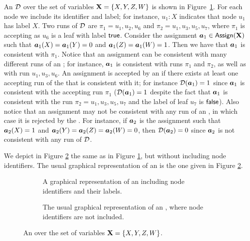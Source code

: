 \begin{example}
  An \nbdd $\mathcal{D}$ over the set of variables $\mathbf{X} = \{X,Y,Z,W\}$ is shown in Figure~\ref{fig-nbdd-with-id}. For each node we include its identifier and label; for instance, $u_1 : X$ indicates that node $u_1$ has label $X$. Two runs of $\mathcal{D}$ are $\pi_1 = u_1,u_2,u_6$ and $\pi_2 = u_1, u_3, u_5, u_7$, where $\pi_1$ is accepting as $u_6$ is a leaf with label $\mathsf{true}$. Consider the assignment $\boldsymbol{a}_1 \in \mathsf{Assign}(\mathbf{X})$ such that $\boldsymbol{a}_1(X) = \boldsymbol{a}_1(Y) = 0$ and $\boldsymbol{a}_1(Z) = \boldsymbol{a}_1(W) = 1$. Then we have that $\boldsymbol{a}_1$ is consistent with $\pi_1$. Notice that an assignment can be consistent with many different runs of an \nbdd; for instance, $\boldsymbol{a}_1$ is consistent with runs $\pi_1$ and $\pi_2$, as well as with run $u_1, u_3, u_6$. An assignment is accepted by an \nbdd if there exists at least one accepting run of the \nbdd that is consistent with it; for instance $\mathcal{D}(\boldsymbol{a}_1) = 1$ since $\boldsymbol{a}_1$ is consistent with the accepting run $\pi_1$ ($\mathcal{D}(\boldsymbol{a}_1) = 1$ despite the fact that $\boldsymbol{a}_1$ is consistent with the run $\pi_2 = u_1, u_3, u_5, u_7$ and the label of leaf $u_7$ is $\mathsf{false}$). Also notice that an assignment may not be consistent with any run  of an \nbdd, in which case it is rejected by the \nbdd. For instance, if $\boldsymbol{a}_2$ is the assignment such that $\boldsymbol{a}_2(X) = 1$ and $\boldsymbol{a}_2(Y) = \boldsymbol{a}_2(Z) = \boldsymbol{a}_2(W) = 0$, then $\mathcal{D}(\boldsymbol{a}_2) = 0$ since $\boldsymbol{a}_2$ is not consistent with any run of $\mathcal{D}$.

We depict in Figure \ref{fig-nbdd-without-id} the same \nbdd as in Figure \ref{fig-nbdd-with-id}, but without including node identifiers. The usual graphical representation of an \nbdd is the one given in  Figure \ref{fig-nbdd-without-id}.
\end{example}

\begin{figure}
\begin{center}
\begin{subfigure}{0.45\textwidth}

\caption{A graphical representation of an \nbdd including node identifiers and their labels.}
\label{fig-nbdd-with-id}
\end{subfigure}
\hspace{5mm}
\begin{subfigure}{0.45\textwidth}

\caption{The usual graphical representation of an \nbdd, where node identifiers are not included.}
\label{fig-nbdd-without-id}
\end{subfigure}
\end{center}
\caption{An \nbdd over the set of variables $\mathbf{X} = \{X,Y,Z,W\}$. \label{fig-nbdd}}
\end{figure}


